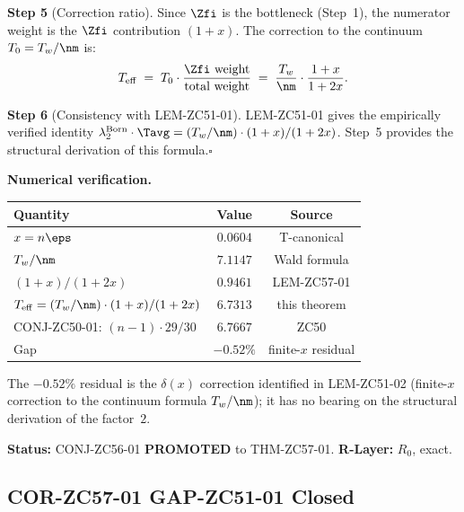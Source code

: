 \documentclass[12pt, a4paper]{article}
\begin{document}
\begin{formalbox}[title={THM-ZC57-01: Two-Sector Correction
  Theorem --- $(1+x)/(1+2x)$ from Sector Rate Asymmetry
  ($R_0$, Exact; promotes CONJ-ZC56-01)}]
\textbf{Step 5} (Correction ratio).
Since $\Zfi$ is the bottleneck (Step~1), the numerator weight
is the $\Zfi$ contribution $(1+x)$.
The correction to the continuum $T_0 = T_w/\nm$ is:
\[
  T_{\rm eff}
  \;=\; T_0 \cdot
  \frac{\text{$\Zfi$ weight}}{\text{total weight}}
  \;=\; \frac{T_w}{\nm}\cdot\frac{1+x}{1+2x}.
\]

\textbf{Step 6} (Consistency with LEM-ZC51-01).
LEM-ZC51-01 gives the empirically verified identity
$\lambda_2^{\rm Born}\cdot\Tavg = (T_w/\nm)\cdot(1+x)/(1+2x)$.
Step~5 provides the structural derivation of this formula.\hfill$\square$

\medskip
\textbf{Numerical verification.}
\begin{center}
\begin{tabular}{@{}lcc@{}}
\toprule
Quantity & Value & Source \\
\midrule
$x = n\eps$ & $0.0604$ & T-canonical \\
$T_w/\nm$ & $7.1147$ & Wald formula \\
$(1+x)/(1+2x)$ & $0.9461$ & LEM-ZC57-01 \\
$T_{\rm eff} = (T_w/\nm)\cdot(1+x)/(1+2x)$ & $6.7313$ & this theorem \\
CONJ-ZC50-01: $(n-1)\cdot29/30$ & $6.7667$ & ZC50 \\
Gap & $-0.52\%$ & finite-$x$ residual \\
\bottomrule
\end{tabular}
\end{center}
The $-0.52\%$ residual is the $\delta(x)$ correction
identified in LEM-ZC51-02 (finite-$x$ correction to the
continuum formula $T_w/\nm$); it has no bearing on the
structural derivation of the factor~$2$.

\textbf{Status:} CONJ-ZC56-01 \textbf{PROMOTED} to THM-ZC57-01.
\textbf{R-Layer:} $R_0$, exact.
\end{formalbox}

\subsection{COR-ZC57-01 \quad GAP-ZC51-01 Closed}
\label{sec:cor01}

\end{document}
